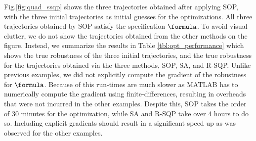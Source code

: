 Fig.\ref{fig:quad_ssqp} shows the three trajectories obtained after applying SOP,
with the three initial trajectories as initial guesses for the optimizations. 
All three trajectories obtained by SOP satisfy the specification $\formula$. 
To avoid visual clutter, we do not show the trajectories obtained from the other methods on the figure.
Instead, we summarize the results in Table \ref{tbl:opt_performance} which shows the true robustness of the three initial trajectories, and the true robustness for the trajectories obtained via the three methods, SOP, SA, and R-SQP. %
Unlike previous examples, we did not explicitly compute the gradient of the robustness for $\formula$. Because of this run-times are much slower as MATLAB has to numerically compute the gradient using finite-differences, resulting in overheads that were not incurred in the other examples. Despite this, SOP takes the order of 30 minutes for the optimization, while SA and R-SQP take over 4 hours to do so. Including explicit gradients should result in a significant speed up as was observed for the other examples. 



